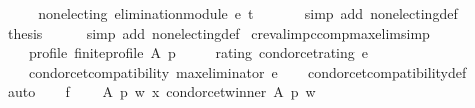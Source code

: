 \begin{isabellebody}
%
\isatagproof
{}\isamarkupfalse%
\ {\isacharminus}{\kern0pt}\isanewline
\ \ \isamarkupfalse%
\ {\isachardoublequoteopen}non{\isacharunderscore}{\kern0pt}electing\ {\isacharparenleft}{\kern0pt}elimination{\isacharunderscore}{\kern0pt}module\ e\ t\ {\isacharparenleft}{\kern0pt}{\isasymle}{\isacharparenright}{\kern0pt}{\isacharparenright}{\kern0pt}{\isachardoublequoteclose}\isanewline
\ \ \ \ \isamarkupfalse%
\ {\isacharparenleft}{\kern0pt}simp\ add{\isacharcolon}{\kern0pt}\ non{\isacharunderscore}{\kern0pt}electing{\isacharunderscore}{\kern0pt}def{\isacharparenright}{\kern0pt}\isanewline
\ \ \isamarkupfalse%
\ {\isacharquery}{\kern0pt}thesis\isanewline
\ \ \ \ \isamarkupfalse%
\ {\isacharparenleft}{\kern0pt}simp\ add{\isacharcolon}{\kern0pt}\ non{\isacharunderscore}{\kern0pt}electing{\isacharunderscore}{\kern0pt}def{\isacharparenright}{\kern0pt}\isanewline
{}\isamarkupfalse%
%
\endisatagproof
{\isafoldproof}%
%
\isadelimproof
%
\endisadelimproof
%
\isadelimdocument
%
\endisadelimdocument
%
\isatagdocument
%
\isamarkuptrue%
%
\endisatagdocument
{\isafolddocument}%
%
\isadelimdocument
%
\endisadelimdocument
{}\isamarkupfalse%
\ cr{\isacharunderscore}{\kern0pt}eval{\isacharunderscore}{\kern0pt}imp{\isacharunderscore}{\kern0pt}ccomp{\isacharunderscore}{\kern0pt}max{\isacharunderscore}{\kern0pt}elim{\isacharbrackleft}{\kern0pt}simp{\isacharbrackright}{\kern0pt}{\isacharcolon}{\kern0pt}\isanewline
\ \ \isanewline
\ \ \ \ profile{\isacharcolon}{\kern0pt}\ {\isachardoublequoteopen}finite{\isacharunderscore}{\kern0pt}profile\ A\ p{\isachardoublequoteclose}\ \isanewline
\ \ \ \ rating{\isacharcolon}{\kern0pt}\ {\isachardoublequoteopen}condorcet{\isacharunderscore}{\kern0pt}rating\ e{\isachardoublequoteclose}\isanewline
\ \ \isanewline
\ \ \ \ {\isachardoublequoteopen}condorcet{\isacharunderscore}{\kern0pt}compatibility\ {\isacharparenleft}{\kern0pt}max{\isacharunderscore}{\kern0pt}eliminator\ e{\isacharparenright}{\kern0pt}{\isachardoublequoteclose}\isanewline
%
\isadelimproof
\ \ %
\endisadelimproof
%
\isatagproof
{}\isamarkupfalse%
\ condorcet{\isacharunderscore}{\kern0pt}compatibility{\isacharunderscore}{\kern0pt}def\isanewline
{}\isamarkupfalse%
\ {\isacharparenleft}{\kern0pt}auto{\isacharparenright}{\kern0pt}\isanewline
\ \ \isamarkupfalse%
\ f{}{\isacharcolon}{\kern0pt}\isanewline
\ \ \ \ {\isachardoublequoteopen}{\isasymAnd}A\ p\ w\ x{\isachardot}{\kern0pt}\ condorcet{\isacharunderscore}{\kern0pt}winner\ A\ p\ w\ {\isasymLongrightarrow}\isanewline

\end{isabellebody}
